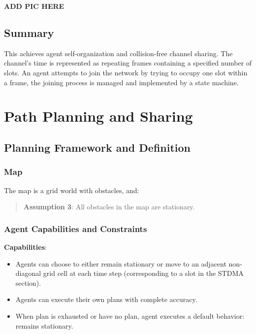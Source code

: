 \textbf{ADD PIC HERE} %

\subsection{Summary}

This achieves agent self-organization and collision-free channel sharing. The channel's time is represented as repeating frames containing a specified number of slots. An agent attempts to join the network by trying to occupy one slot within a frame, the joining process is managed and implemented by a state machine.

\section{Path Planning and Sharing}


\subsection{Planning Framework and Definition}


\subsubsection{Map}
The map is a grid world with obstacles, and:
\begin{quotation}
    \textbf{Assumption 3}:
    All obstacles in the map are stationary.
\end{quotation}

\subsubsection{Agent Capabilities and Constraints}

\textbf{Capabilities}:
\begin{itemize}
    \item Agents can choose to either remain stationary or move to an adjacent non-diagonal grid cell at each time step (corresponding to a slot in the STDMA section).
    \item Agents can execute their own plans with complete accuracy.
    \item When plan is exhausted or have no plan, agent executes a default behavior: remains stationary.
\end{itemize}


